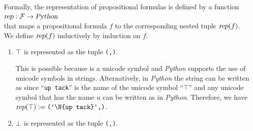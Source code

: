Formally, the representation of propositional formulas is defined by a function 
\\[0.2cm]
\hspace*{1.3cm}
$\textsl{rep}: \mathcal{F} \rightarrow \textsl{Python}$
\\[0.2cm]
that maps a propositional formula $f$ to the corresponding nested tuple 
$\textsl{rep}(f)$.  We define $\textsl{rep}(f)$ inductively by induction on $f$.
\begin{enumerate}
\item $\top$ is represented as the tuple \texttt{(\tsq{$\top$},)}.
  
      This is possible because \texttt{\tsq{$\top$}} is a unicode symbol and \textsl{Python} supports the use of unicode
      symbols in strings.   Alternatively, in \textsl{Python} the string \texttt{\tsq{$\top$}} can be written as
      \texttt{} since ``\texttt{up tack}'' is the name of the unicode symbol
      ``$\top$'' and any unicode symbol that has the name  $u$ can be written 
      as \texttt{} in \textsl{Python}.  Therefore, we have
      \\[0.2cm]
      \hspace*{1.3cm}
      $\textsl{rep}(\verum) := \texttt{(\tsq{\symbol{92}N\{up tack\}},)}$.
\item $\falsum$  is represented as the tuple \texttt{(\tsq{$\falsum$},)}.
      

\end{enumerate}
